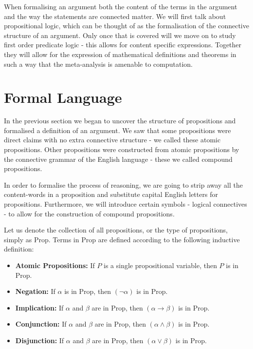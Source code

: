 \documentclass{book}
\begin{document}
When formalising an argument both the content of the terms in the argument and the way the statements are connected matter. We will first talk about propositional logic, which can be thought of as the formalisation of the connective structure of an argument. Only once that is covered will we move on to study first order predicate logic - this allows for content specific expressions. Together they will allow for the expression of mathematical definitions and theorems in such a way that the meta-analysis is amenable to computation. 

\section{Formal Language}


In the previous section we began to uncover the structure of propositions and formalised a definition of an argument. We saw that some propositions were direct claims with no extra connective structure - we called these atomic propositions. Other propositions were constructed from atomic propositions by the connective grammar of the English language - these we called compound propositions. 

In order to formalise the process of reasoning, we are going to strip away all the content-words in a proposition and substitute capital English letters for propositions. Furthermore, we will introduce certain symbols - logical connectives - to allow for the construction of compound propositions. 






Let us denote the collection of all propositions, or the type of propositions, simply as Prop. Terms in Prop are defined according to the following inductive definition: 

\begin{itemize}
    \item {\bf Atomic Propositions:} If $P$ is a single propositional variable, then $P$ is in Prop.
    \item {\bf Negation:} If $\alpha$ is in Prop, then $(\lnot\alpha)$ is in Prop. 
    \item {\bf Implication:} If $\alpha$ and $\beta$ are in Prop, then $(\alpha \to \beta)$ is in Prop.
    \item {\bf Conjunction:} If $\alpha$ and $\beta$ are in Prop, then $(\alpha \land \beta)$ is in Prop.
    \item {\bf Disjunction:} If $\alpha$ and $\beta$ are in Prop, then $(\alpha \lor \beta)$ is in Prop. 		
\end{itemize}
\end{document}
